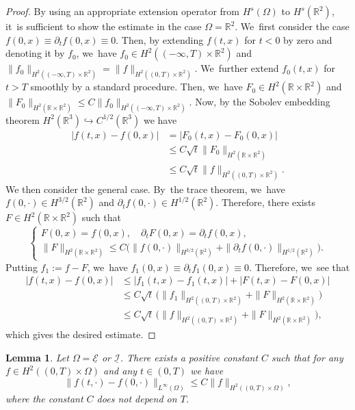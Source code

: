 \documentclass[11pt]{article}
\newcommand{\R}{{\mathbb R}}
\newcommand{\dt}{\partial_t}
\newcommand{\cI}{{\mathcal I}}
\newcommand{\cE}{{\mathcal E}}
\newcommand{\ul}[1]{\underline{#1}}
\newtheorem{lemma}[theorem]{Lemma}
\theoremstyle{definition}
\begin{document}
\begin{proof}
By using an appropriate extension operator from $H^s(\Omega)$ to $H^s(\R^2)$, it~is sufficient to show the estimate in the case $\Omega=\R^2$. We~first consider the case $f(0,x)\equiv \dt f(0,x)\equiv0$.
Then, by extending $f(t,x)$ for $t<0$ by zero and denoting it by $f_0$, we~have $f_0\in H^2((-\infty,T)\times\R^2)$ and $\|f_0\|_{H^2((-\infty,T)\times\R^2)}=\|f\|_{H^2((0,T)\times\R^2)}$. We~further extend $f_0(t,x)$ for $t>T$ smoothly by a standard procedure.
Then, we~have $F_0\in H^2(\R\times\R^2)$ and
$\|F_0\|_{H^2(\R\times\R^2)} \leq C\|f_0\|_{H^2((-\infty,T)\times\R^2)}$.
Now, by the Sobolev embedding theorem $H^2(\R^3) \hookrightarrow C^{1/2}(\R^3)$ we have
\begin{align*}
|f(t,x)-f(0,x)|
&= |F_0(t,x)-F_0(0,x)| \\
&\leq C\sqrt{t}\|F_0\|_{H^2(\R\times\R^2)} \\
&\leq C\sqrt{t}\|f\|_{H^2((0,T)\times\R^2)}.
\end{align*}
We then consider the general case. By~the trace theorem, we~have $f(0,\cdot) \in H^{3/2}(\R^2)$ and $\dt f(0,\cdot) \in H^{1/2}(\R^2)$.
Therefore, there exists $F\in H^2(\R\times\R^2)$ such that
\[
\begin{cases}
F(0,x)=f(0,x), \quad \dt F(0,x)=\dt f(0,x), \\
\|F\|_{H^2(\R\times\R^2)}
\leq C(\|f(0,\cdot)\|_{H^{3/2}(\R^2)} + \|\dt f(0,\cdot)\|_{H^{1/2}(\R^2)} \bigr).
\end{cases}
\]
Putting $f_1:=f-F$, we~have $f_1(0,x)\equiv \dt f_1(0,x)\equiv0$.
Therefore, we~see that
\begin{align*}
|f(t,x)-f(0,x)|
&\leq |f_1(t,x)-f_1(t,x)| + |F(t,x)-F(0,x)| \\
&\leq C\sqrt{t}\, \bigl(\|f_1\|_{H^2((0,T)\times\R^2)} + \|F\|_{H^2(\R\times\R^2)} \bigr) \\
&\leq C\sqrt{t}\, \bigl(\|f\|_{H^2((0,T)\times\R^2)} + \|F\|_{H^2(\R\times\R^2)} \bigr),
\end{align*}
which gives the desired estimate.
\end{proof}

\begin{lemma}\label{lem:Embedding2}
Let $\Omega=\ul{\cE}$ or $\ul{\cI}$.
There exists a positive constant $C$ such that for any $f\in H^2((0,T)\times\Omega)$
and any $t\in(0,T)$ we have
\[
\|f(t,\cdot)-f(0,\cdot)\|_{L^\infty(\Omega)} \leq C \|f\|_{H^2((0,T)\times\Omega)},
\]
where the constant $C$ does not depend on $T$.
\end{lemma}
\end{document}

